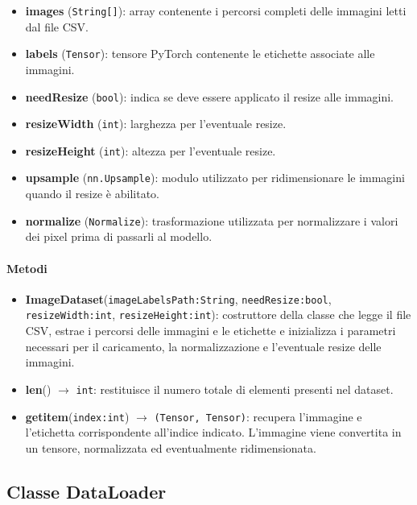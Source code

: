 \begin{itemize}
    \raggedright
    \item \textbf{images} (\texttt{String[]}): array contenente i percorsi
    completi delle immagini letti dal file CSV.
    \item \textbf{labels} (\texttt{Tensor}): tensore PyTorch contenente le
    etichette associate alle immagini.
    \item \textbf{needResize} (\texttt{bool}): indica se deve essere
    applicato il resize alle immagini.
    \item \textbf{resizeWidth} (\texttt{int}): larghezza per l'eventuale
    resize.
    \item \textbf{resizeHeight} (\texttt{int}): altezza per l'eventuale
    resize.
    \item \textbf{upsample} (\texttt{nn.Upsample}): modulo utilizzato
    per ridimensionare le immagini quando il resize è abilitato.
    \item \textbf{normalize} (\texttt{Normalize}): trasformazione
    utilizzata per normalizzare i valori dei pixel prima di passarli al
    modello.
\end{itemize}

\paragraph{Metodi}

\begin{itemize}
    \raggedright
    \item \textbf{ImageDataset}(\texttt{imageLabelsPath:String},
    \texttt{needResize:bool}, \texttt{resizeWidth:int},
    \texttt{resizeHeight:int}): costruttore della classe che legge il file
    CSV, estrae i percorsi delle immagini e le etichette e inizializza i
    parametri necessari per il caricamento, la normalizzazione e l’eventuale resize delle immagini.
    \item \textbf{len}() $\rightarrow$ \texttt{int}: restituisce
    il numero totale di elementi presenti nel dataset.
    \item \textbf{getitem}(\texttt{index:int})
    $\rightarrow$ \texttt{(Tensor, Tensor)}: recupera l’immagine e
    l’etichetta corrispondente all’indice indicato. L’immagine viene
    convertita in un tensore, normalizzata ed eventualmente ridimensionata.
\end{itemize}

\subsection{Classe DataLoader}

